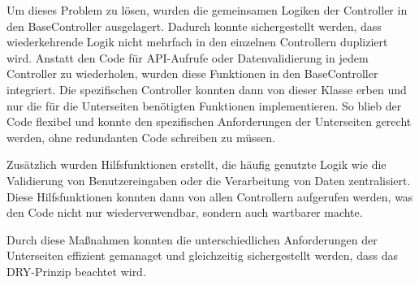 Um dieses Problem zu lösen, wurden die gemeinsamen Logiken der Controller in den BaseController ausgelagert.
Dadurch konnte sichergestellt werden, dass wiederkehrende Logik nicht mehrfach in den einzelnen Controllern dupliziert wird.
Anstatt den Code für API-Aufrufe oder Datenvalidierung in jedem Controller zu wiederholen, wurden diese Funktionen in den BaseController integriert.
Die spezifischen Controller konnten dann von dieser Klasse erben und nur die für die Unterseiten benötigten Funktionen implementieren.
So blieb der Code flexibel und konnte den spezifischen Anforderungen der Unterseiten gerecht werden, ohne redundanten Code schreiben zu müssen.

Zusätzlich wurden Hilfsfunktionen erstellt, die häufig genutzte Logik wie die Validierung von Benutzereingaben oder die Verarbeitung von Daten zentralisiert.
Diese Hilfsfunktionen konnten dann von allen Controllern aufgerufen werden, was den Code nicht nur wiederverwendbar, sondern auch wartbarer machte.

Durch diese Maßnahmen konnten die unterschiedlichen Anforderungen der Unterseiten effizient gemanaget und gleichzeitig sichergestellt werden, dass das DRY-Prinzip beachtet wird.